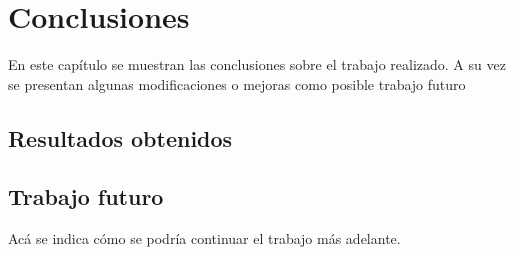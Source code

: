 
\chapter{Conclusiones} %

\label{Chapter5} %





En este capítulo se muestran las conclusiones sobre el trabajo realizado. A su vez
se presentan algunas modificaciones o mejoras como posible trabajo futuro
\section{Resultados obtenidos }

\section{Trabajo futuro}

Acá se indica cómo se podría continuar el trabajo más adelante.
